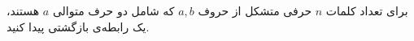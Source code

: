 \EXERCISE
برای تعداد کلمات
$n$
حرفی متشکل از حروف
$a, b$
که شامل دو حرف متوالی
$a$
هستند، یک رابطه‌ی بازگشتی پیدا کنید.